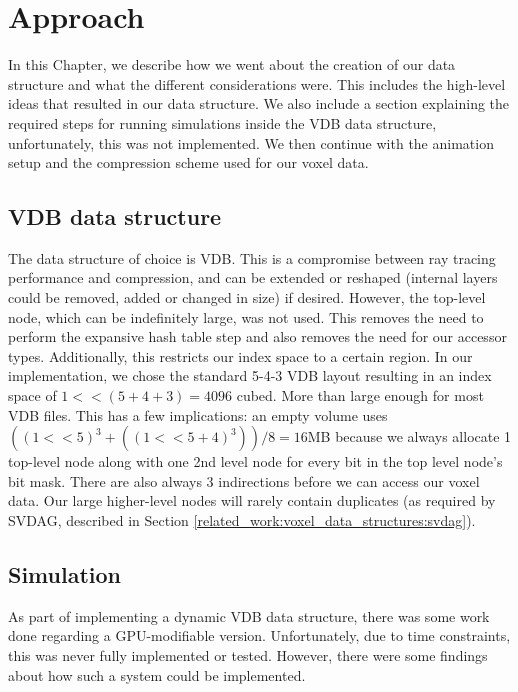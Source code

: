 \section{Approach} \label{approach}
In this Chapter, we describe how we went about the creation of our data structure and what the different considerations were. This includes the high-level ideas that resulted in our data structure. We also include a section explaining the required steps for running simulations inside the VDB data structure, unfortunately, this was not implemented. We then continue with the animation setup and the compression scheme used for our voxel data.




\subsection{VDB data structure} \label{approach:vdb_data_structure}
The data structure of choice is VDB. This is a compromise between ray tracing performance and compression, and can be extended or reshaped (internal layers could be removed, added or changed in size) if desired. However, the top-level node, which can be indefinitely large, was not used. This removes the need to perform the expansive hash table step and also removes the need for our accessor types. Additionally, this restricts our index space to a certain region. In our implementation, we chose the standard 5-4-3 VDB layout resulting in an index space of $1 << (5+4+3) = 4096$ cubed. More than large enough for most VDB files. This has a few implications: an empty volume uses $((1<<5)^3+((1<<5+4)^3)) / 8 = 16$MB because we always allocate 1 top-level node along with one 2nd level node for every bit in the top level node's bit mask. There are also always 3 indirections before we can access our voxel data. Our large higher-level nodes will rarely contain duplicates (as required by SVDAG, described in Section \ref{related_work:voxel_data_structures:svdag}).

\subsection{Simulation} \label{approach:simulation}
As part of implementing a dynamic VDB data structure, there was some work done regarding a GPU-modifiable version. Unfortunately, due to time constraints, this was never fully implemented or tested. However, there were some findings about how such a system could be implemented.


